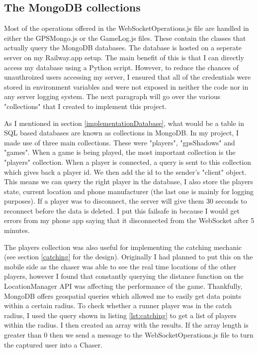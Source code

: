 \documentclass{l4proj}
\begin{document}
\subsection{The MongoDB collections}
\label{mongocollections}
Most of the operations offered in the WebSocketOperations.js file are handled in either the GPSMongo.js or the GameLog.js
files. These contain the classes that actually query the MongoDB databases. The database is hosted on a seperate
server on my Railway.app setup. The main benefit of this is that I can directly access my database using a Python
script. However, to reduce the chances of unauthroized users accessing my server, I ensured that all of the credentials
were stored in environment variables and were not exposed in neither the code nor in any server logging system. The
next paragraph will go over the various "collections" that I created to implement this project.

As I mentioned in section \ref{implementationDatabase}, what would be a table in SQL based databases are known as collections in MongoDB.
In my project, I made use of three main collections. These were "players", "gpsShadows" and "games". When a game is being played, the most
important collection is the "players" collection. When a player is connected, a query is sent to this collection which gives back a player id.
We then add the id to the sender's "client" object. This means we can query the right player in the database, I also store the players state,
current location and phone manufacturer (the last one is mainly for logging purposes). If a player was to disconnect, the server will give
them 30 seconds to reconnect before the data is deleted. I put this failsafe in because I would get errors from my phone app saying
that it disconnected from the WebSocket after 5 minutes.

The players collection was also useful for implementing the catching mechanic (see section \ref{catching} for the design). Originally I had planned to put this on the mobile side
as the chaser was able to see the real time locations of the other players, however I found that constantly querying the distance function
on the LocationManager API was affecting the performance of the game. Thankfully, MongoDB offers geospatial queries which allowed me to
easily get data points within a certain radius. To check whether a runner player was in the catch radius, I used the query shown in
listing \ref{lst:catching} to get a list of players within the radius. I then created an array with the results. If the array length is greater
than 0 then we send a message to the WebSocketOperations.js file to turn the captured user into a Chaser.
\end{document}
